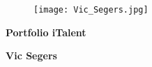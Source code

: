 \begin{titlepage}
  \hspace{0pt}
  \vfill
  \begin{figure}[h!]
    \centering
    \texttt{[image: Vic\_Segers.jpg]}
  \end{figure}
  \begin{center}
    \Huge\textbf{{Portfolio iTalent}}
  \end{center}
  \begin{center}
    \Large\textbf{Vic Segers}
  \end{center}
  \vfill
  \hspace{0pt}
\end{titlepage}